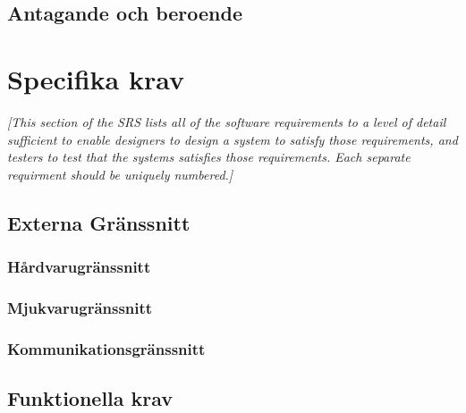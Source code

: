 \documentclass{article}
\begin{document}
\begin{enumerate}
\subsection{Antagande och beroende}
\label{subsec:Antagande och beroende}

\section{Specifika krav}
\label{sec:Specifika krav}
\emph{[This section of the \ac{SRS} lists all of the software requirements to
  a level of detail sufficient to enable designers to design a system to
  satisfy those requirements, and testers to test that the systems satisfies
  those requirements. Each separate requirment should be uniquely numbered.]}

\subsection{Externa Gränssnitt}
\label{subsec:Externa Granssnitt}
\subsubsection{Hårdvarugränssnitt}
\label{subsec:EG-Hardvarugranssnitt}
\subsubsection{Mjukvarugränssnitt}
\label{subsec:EG-Mjukvarugranssnitt}
\subsubsection{Kommunikationsgränssnitt}
\label{subsec:EG-Kommunikationsgranssnitt}
\subsection{Funktionella krav}
\label{subsec:Funktionella krav}

\end{enumerate}
\end{document}
